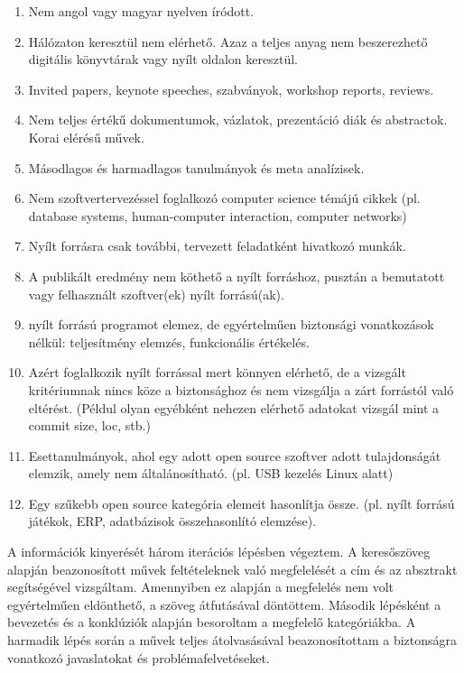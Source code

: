 \documentclass[12pt,magyar,a4paper,oneside]{scrreprt}
\providecommand{\tightlist}{%
  \setlength{\itemsep}{0pt}\setlength{\parskip}{0pt}}
\begin{document}
\begin{enumerate}
\def\labelenumi{\arabic{enumi}.}
\tightlist
\item
  Nem angol vagy magyar nyelven íródott.
\item
  Hálózaton keresztül nem elérhető. Azaz a teljes anyag nem beszerezhető
  digitális könyvtárak vagy nyílt oldalon keresztül.
\item
  Invited papers, keynote speeches, szabványok, workshop reports,
  reviews.
\item
  Nem teljes értékű dokumentumok, vázlatok, prezentáció diák és
  abstractok. Korai elérésű művek.
\item
  Másodlagos és harmadlagos tanulmányok és meta analízisek.
\item
  Nem szoftvertervezéssel foglalkozó computer science témájú cikkek (pl.
  database systems, human-computer interaction, computer networks)
\item
  Nyílt forrásra csak további, tervezett feladatként hivatkozó munkák.
\item
  A publikált eredmény nem köthető a nyílt forráshoz, pusztán a
  bemutatott vagy felhasznált szoftver(ek) nyílt forrású(ak).
\item
  nyílt forrású programot elemez, de egyértelműen biztonsági
  vonatkozások nélkül: teljesítmény elemzés, funkcionális értékelés.
\item
  Azért foglalkozik nyílt forrással mert könnyen elérhető, de a vizsgált
  kritériumnak nincs köze a biztonsághoz és nem vizsgálja a zárt
  forrástól való eltérést. (Példul olyan egyébként nehezen elérhető
  adatokat vizsgál mint a commit size, loc, stb.)
\item
  Esettanulmányok, ahol egy adott open source szoftver adott
  tulajdonságát elemzik, amely nem általánosítható. (pl. USB kezelés
  Linux alatt)
\item
  Egy szűkebb open source kategória elemeit hasonlítja össze. (pl. nyílt
  forrású játékok, ERP, adatbázisok összehasonlító elemzése).
\end{enumerate}

A információk kinyerését három iterációs lépésben végeztem. A
keresőszöveg alapján beazonosított művek feltételeknek való megfelelését
a cím és az absztrakt segítségével vizsgáltam. Amennyiben ez alapján a
megfelelés nem volt egyértelműen eldönthető, a szöveg átfutásával
döntöttem. Második lépésként a bevezetés és a konklúziók alapján
besoroltam a megfelelő kategóriákba. A harmadik lépés során a művek
teljes átolvasásával beazonosítottam a biztonságra vonatkozó
javaslatokat és problémafelvetéseket.
\end{document}
